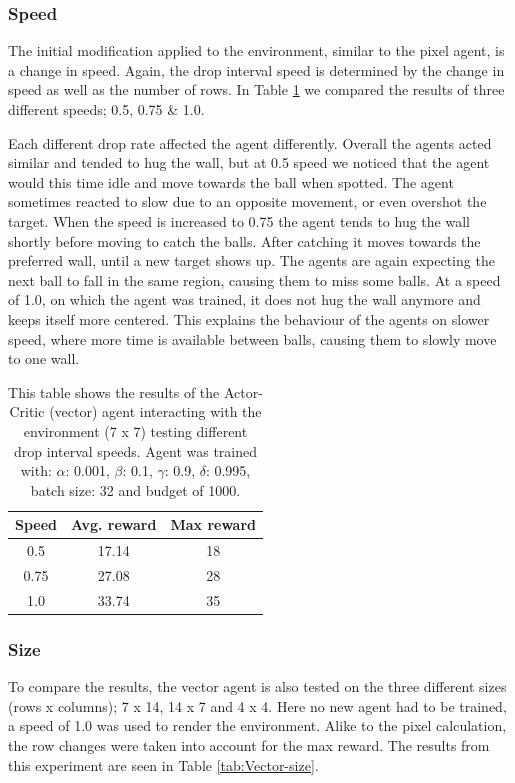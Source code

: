 \documentclass{article}
\begin{document}
\subsubsection{Speed}
The initial modification applied to the environment, similar to the pixel agent, is a change in speed.
Again, the drop interval speed is determined by the change in speed as well as the number of rows. 
In Table \ref{tab:Vector-speed} we compared the results of three different speeds; 0.5, 0.75 \& 1.0. 

Each different drop rate affected the agent differently. 
Overall the agents acted similar and tended to hug the wall, but at 0.5 speed we noticed that the agent would this time idle and move towards the ball when spotted.
The agent sometimes reacted to slow due to an opposite movement, or even overshot the target. 
When the speed is increased to 0.75 the agent tends to hug the wall shortly before moving to catch the balls.
After catching it moves towards the preferred wall, until a new target shows up.
The agents are again expecting the next ball to fall in the same region, causing them to miss some balls.
At a speed of 1.0, on which the agent was trained, it does not hug the wall anymore and keeps itself more centered.
This explains the behaviour of the agents on slower speed, where more time is available between balls, causing them to slowly move to one wall. 

\begin{table}[]
    \centering
    \begin{tabular}{|c|c|c|}
        \hline
        \textbf{Speed} & \textbf{Avg. reward} & \textbf{Max reward} \\
        \hline
        0.5   & 17.14       & 18                  \\
        0.75   & 27.08       & 28                  \\
        1.0   & 33.74        & 35                 \\
        \hline
    \end{tabular}
    \caption{This table shows the results of the Actor-Critic (vector) agent interacting with the environment (7 x 7) testing different drop interval speeds. Agent was trained with: $\alpha$: 0.001, $\beta$: 0.1, $\gamma$: 0.9, $\delta$: 0.995, batch size: 32 and budget of 1000. }
    \label{tab:Vector-speed}
\end{table}

\subsubsection{Size}
To compare the results, the vector agent is also tested on the three different sizes (rows x columns); 7 x 14, 14 x 7 and 4 x 4. 
Here no new agent had to be trained, a speed of 1.0 was used to render the environment. 
Alike to the pixel calculation, the row changes were taken into account for the max reward. 
The results from this experiment are seen in Table \ref{tab:Vector-size}.
\end{document}
